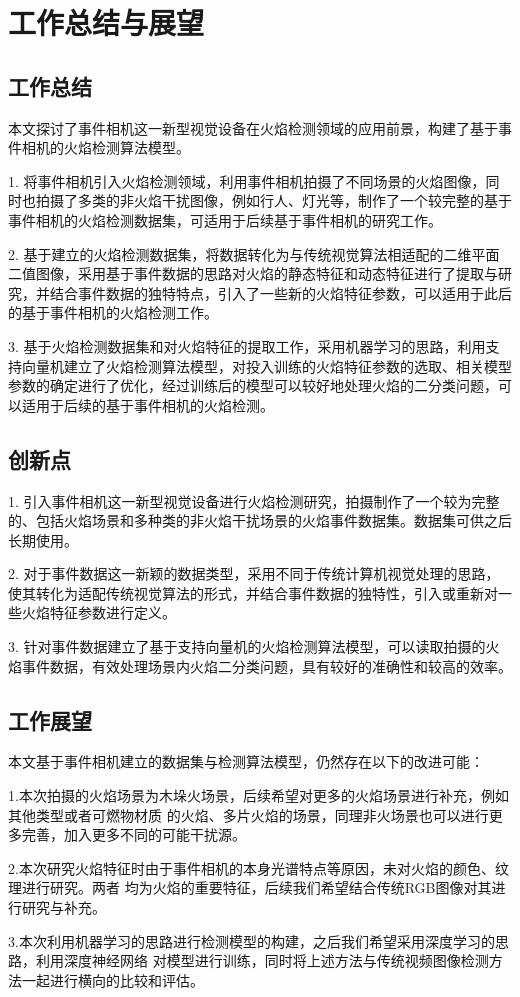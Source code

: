 
\chapter{工作总结与展望}

\section{工作总结}
本文探讨了事件相机这一新型视觉设备在火焰检测领域的应用前景，构建了基于事件相机的火焰检测算法模型。

1. 将事件相机引入火焰检测领域，利用事件相机拍摄了不同场景的火焰图像，同时也拍摄了多类的非火焰干扰图像，例如行人、灯光等，制作了一个较完整的基于事件相机的火焰检测数据集，可适用于后续基于事件相机的研究工作。
 
2. 基于建立的火焰检测数据集，将数据转化为与传统视觉算法相适配的二维平面二值图像，采用基于事件数据的思路对火焰的静态特征和动态特征进行了提取与研究，并结合事件数据的独特特点，引入了一些新的火焰特征参数，可以适用于此后的基于事件相机的火焰检测工作。

3. 基于火焰检测数据集和对火焰特征的提取工作，采用机器学习的思路，利用支持向量机建立了火焰检测算法模型，对投入训练的火焰特征参数的选取、相关模型参数的确定进行了优化，经过训练后的模型可以较好地处理火焰的二分类问题，可以适用于后续的基于事件相机的火焰检测。

\section{创新点}
1. 引入事件相机这一新型视觉设备进行火焰检测研究，拍摄制作了一个较为完整的、包括火焰场景和多种类的非火焰干扰场景的火焰事件数据集。数据集可供之后长期使用。

2. 对于事件数据这一新颖的数据类型，采用不同于传统计算机视觉处理的思路，使其转化为适配传统视觉算法的形式，并结合事件数据的独特性，引入或重新对一些火焰特征参数进行定义。

3. 针对事件数据建立了基于支持向量机的火焰检测算法模型，可以读取拍摄的火焰事件数据，有效处理场景内火焰二分类问题，具有较好的准确性和较高的效率。
\section{工作展望}
本文基于事件相机建立的数据集与检测算法模型，仍然存在以下的改进可能：

1.本次拍摄的火焰场景为木垛火场景，后续希望对更多的火焰场景进行补充，例如其他类型或者可燃物材质
的火焰、多片火焰的场景，同理非火场景也可以进行更多完善，加入更多不同的可能干扰源。

2.本次研究火焰特征时由于事件相机的本身光谱特点等原因，未对火焰的颜色、纹理进行研究。两者
均为火焰的重要特征，后续我们希望结合传统RGB图像对其进行研究与补充。

3.本次利用机器学习的思路进行检测模型的构建，之后我们希望采用深度学习的思路，利用深度神经网络
对模型进行训练，同时将上述方法与传统视频图像检测方法一起进行横向的比较和评估。